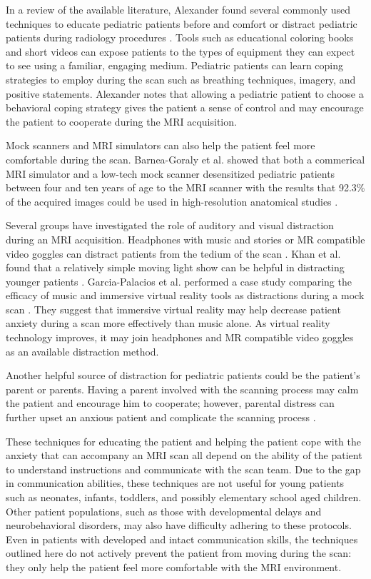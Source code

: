 In a review of the available literature, Alexander found several commonly used techniques to educate pediatric patients before and comfort or distract pediatric patients during radiology procedures \cite{Alexander2012}. Tools such as educational coloring books and short videos can expose patients to the types of equipment they can expect to see using a familiar, engaging medium. Pediatric patients can learn coping strategies to employ during the scan such as breathing techniques, imagery, and positive statements. Alexander notes that allowing a pediatric patient to choose a behavioral coping strategy gives the patient a sense of control and may encourage the patient to cooperate during the MRI acquisition.

Mock scanners and MRI simulators can also help the patient feel more comfortable during the scan. Barnea-Goraly et al. showed that both a commerical MRI simulator and a low-tech mock scanner desensitized pediatric patients between four and ten years of age to the MRI scanner with the results that 92.3\% of the acquired images could be used in high-resolution anatomical studies \cite{Barnea-Goraly2014}. 

Several groups have investigated the role of auditory and visual distraction during an MRI acquisition. Headphones with music and stories or MR compatible video goggles can distract patients from the tedium of the scan \cite{Alexander2012} \cite{Barnea-Goraly2014} \cite{Harned2001}. Khan et al. found that a relatively simple moving light show can be helpful in distracting younger patients \cite{Khan2007}. Garcia-Palacios et al. performed a case study comparing the efficacy of music and immersive virtual reality tools as distractions during a mock scan \cite{Garcia-Palacios2007}. They suggest that immersive virtual reality may help decrease patient anxiety during a scan more effectively than music alone. As virtual reality technology improves, it may join headphones and MR compatible video goggles as an available distraction method.

Another helpful source of distraction for pediatric patients could be the patient's parent or parents. Having a parent involved with the scanning process may calm the patient and encourage him to cooperate; however, parental distress can further upset an anxious patient and complicate the scanning process \cite{Alexander2012}. 

These techniques for educating the patient and helping the patient cope with the anxiety that can accompany an MRI scan all depend on the ability of the patient to understand instructions and communicate with the scan team. Due to the gap in communication abilities, these techniques are not useful for young patients such as neonates, infants, toddlers, and possibly elementary school aged children. Other patient populations, such as those with developmental delays and neurobehavioral disorders, may also have difficulty adhering to these protocols. Even in patients with developed and intact communication skills, the techniques outlined here do not actively prevent the patient from moving during the scan: they only help the patient feel more comfortable with the MRI environment.

